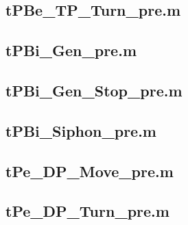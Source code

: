\documentclass[runningheads,a4paper]{llncs}
\newcommand{\GPenSIM}{../GPenSIM}
\begin{document}
\subsection{tPBe\_TP\_Turn\_pre.m}
\label{app:tPBe_TP_Turn_pre.m}


\subsection{tPBi\_Gen\_pre.m}
\label{app:tPBi_Gen_pre.m}


\subsection{tPBi\_Gen\_Stop\_pre.m}
\label{app:tPBi_Gen_Stop_pre.m}


\subsection{tPBi\_Siphon\_pre.m}
\label{app:tPBi_Siphon_pre.m}


\subsection{tPe\_DP\_Move\_pre.m}
\label{app:tPe_DP_Move_pre.m}


\subsection{tPe\_DP\_Turn\_pre.m}
\label{app:tPe_DP_Turn_pre.m}

\end{document}
